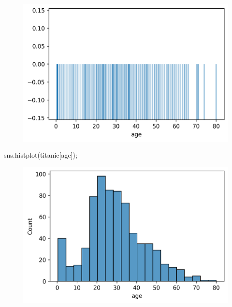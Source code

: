 \documentclass[
  letterpaper,
  DIV=11,
  numbers=noendperiod]{scrreprt}
\newenvironment{Shaded}{\begin{snugshade}}{\end{snugshade}}
\newcommand{\NormalTok}[1]{\textcolor[rgb]{0.00,0.23,0.31}{#1}}
\newcommand{\OperatorTok}[1]{\textcolor[rgb]{0.37,0.37,0.37}{#1}}
\newcommand{\StringTok}[1]{\textcolor[rgb]{0.13,0.47,0.30}{#1}}
\begin{document}
\begin{figure}[H]

{\centering \includegraphics{visualization_2/visualization_2_files/figure-pdf/cell-2-output-1.png}

}

\end{figure}

\begin{Shaded}
\begin{Highlighting}[]
\NormalTok{sns.histplot(titanic[}\StringTok{\textquotesingle{}age\textquotesingle{}}\NormalTok{])}\OperatorTok{;}
\end{Highlighting}
\end{Shaded}

\begin{figure}[H]

{\centering \includegraphics{visualization_2/visualization_2_files/figure-pdf/cell-3-output-1.png}

}

\end{figure}
\end{document}
